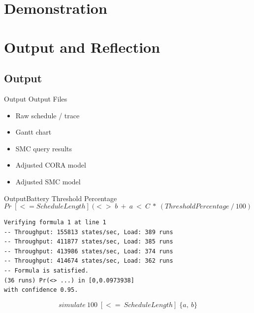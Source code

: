 \section{Demonstration}
\section{Output and Reflection}
\subsection{Output}
\begin{frame}{Output}{}
	Output Files
	\begin{itemize}
		\item Raw schedule / trace
		\item Gantt chart
		\item SMC query results
		\item Adjusted CORA model
		\item Adjusted SMC model
	\end{itemize}
\end{frame}

\begin{frame}[fragile]{Output}{Battery Threshold Percentage}
	\begin{equation*}
		Pr\; [<=ScheduleLength] \; (<>\; b\ +\ a\ <\ C\ *\ (ThresholdPercentage\ /\ 100)
	\end{equation*}
	\begin{lstlisting}
Verifying formula 1 at line 1
-- Throughput: 155813 states/sec, Load: 389 runs
-- Throughput: 411877 states/sec, Load: 385 runs
-- Throughput: 413986 states/sec, Load: 374 runs
-- Throughput: 414674 states/sec, Load: 362 runs
-- Formula is satisfied.
(36 runs) Pr(<> ...) in [0,0.0973938]
with confidence 0.95.
	\end{lstlisting}
	\pause
	\begin{equation*}
		simulate\ 100 \; [<=\ ScheduleLength]\; \{ a,\ b\}
	\end{equation*}
\end{frame}

